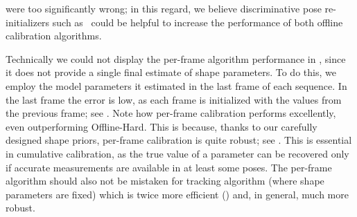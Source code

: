 were too significantly wrong; in this regard, we believe discriminative pose re-initializers such as~\cite{oberweger2015hands} could be helpful to increase the performance of both offline calibration algorithms.

\begin{edit}
Technically we could not display the per-frame algorithm performance in , since it does not provide a single final estimate of shape parameters. To do this, we employ the model parameters it estimated in the last frame of each sequence. In the last frame the error is low, as each frame is initialized with the values from the previous frame; see \VideoReal{}. Note how per-frame calibration performs excellently, even outperforming Offline-Hard. This is because, thanks to our carefully designed shape priors, per-frame calibration is quite robust; see \VideoReal{}. This is essential in cumulative calibration, as the true value of a parameter can be recovered only if accurate measurements are available in at least some poses. The per-frame algorithm should also not be mistaken for tracking algorithm (where shape parameters are fixed) which is twice more efficient () and, in general, much more robust.
\end{edit}

